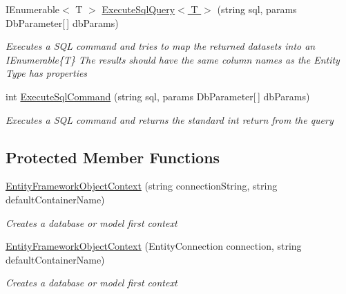 \begin{DoxyCompactItemize}
I\-Enumerable$<$ T $>$ \hyperlink{class_highway_1_1_data_1_1_entity_framework_1_1_contexts_1_1_entity_framework_object_context_a2b385a19abb43ebe167ba4f517af51f2}{Execute\-Sql\-Query$<$ T $>$} (string sql, params Db\-Parameter\mbox{[}$\,$\mbox{]} db\-Params)
\begin{DoxyCompactList}\small\item\em Executes a S\-Q\-L command and tries to map the returned datasets into an I\-Enumerable\{\-T\} The results should have the same column names as the Entity Type has properties \end{DoxyCompactList}\item 
int \hyperlink{class_highway_1_1_data_1_1_entity_framework_1_1_contexts_1_1_entity_framework_object_context_a5b6f659e95b783a131f380bbce6c68dd}{Execute\-Sql\-Command} (string sql, params Db\-Parameter\mbox{[}$\,$\mbox{]} db\-Params)
\begin{DoxyCompactList}\small\item\em Executes a S\-Q\-L command and returns the standard int return from the query \end{DoxyCompactList}\end{DoxyCompactItemize}
\subsection*{Protected Member Functions}
\begin{DoxyCompactItemize}
\item 
\hyperlink{class_highway_1_1_data_1_1_entity_framework_1_1_contexts_1_1_entity_framework_object_context_a49ccc3a1e6adc42307dcaf058b8a2e95}{Entity\-Framework\-Object\-Context} (string connection\-String, string default\-Container\-Name)
\begin{DoxyCompactList}\small\item\em Creates a database or model first context \end{DoxyCompactList}\item 
\hyperlink{class_highway_1_1_data_1_1_entity_framework_1_1_contexts_1_1_entity_framework_object_context_a1ea5b94cf21d9fdc222bf5a446a32ff8}{Entity\-Framework\-Object\-Context} (Entity\-Connection connection, string default\-Container\-Name)
\begin{DoxyCompactList}\small\item\em Creates a database or model first context \end{DoxyCompactList}\end{DoxyCompactItemize}
